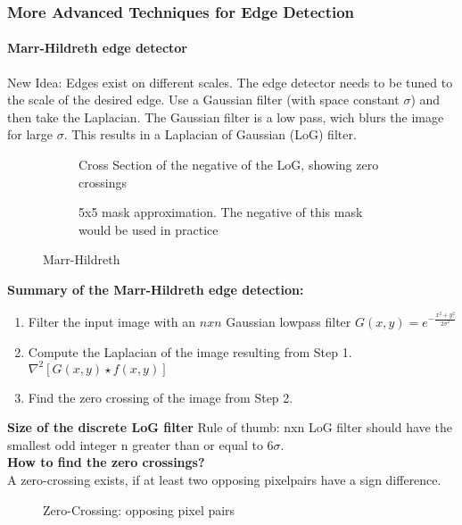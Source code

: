 \subsubsection{More Advanced Techniques for Edge Detection}
\paragraph{Marr-Hildreth edge detector}
New Idea: Edges exist on different scales. The edge detector needs to be tuned to the scale of the desired edge. Use a Gaussian filter (with space constant $\sigma$) and then take the Laplacian. The Gaussian filter is a low pass, wich blurs the image for large $\sigma$. This results in a Laplacian of Gaussian (LoG) filter.
\begin{figure}[h]
	\centering
	\begin{subfigure}[b]{0.45\textwidth}
		\centering
		\caption{Cross Section of the negative of the LoG, showing zero crossings}
	\end{subfigure}
	\begin{subfigure}[b]{0.45\textwidth}
		\centering
		\caption{5x5 mask approximation. The negative of this mask would be used in practice}
	\end{subfigure}
	\caption{Marr-Hildreth}
\end{figure}

\textbf{Summary of the Marr-Hildreth edge detection:}
\begin{enumerate}
\item Filter the input image with an $n x n$ Gaussian lowpass filter $G(x,y)=e^{-\frac{x^2+y^2}{2\sigma^2}}$
\item Compute the Laplacian of the image resulting from Step 1. $\nabla ^2[G(x,y) \star f(x,y)]$
\item Find the zero crossing of the image from Step 2.
\end{enumerate}
\textbf{Size of the discrete LoG filter}
Rule of thumb: nxn LoG filter should have the smallest odd integer n greater than or equal to $6\sigma$.\\
\textbf{How to find the zero crossings?}\\
A zero-crossing exists, if at least two opposing pixelpairs have a sign difference.
\begin{figure}[!h]
	\centering
	\caption{Zero-Crossing: opposing pixel pairs}	
\end{figure}

